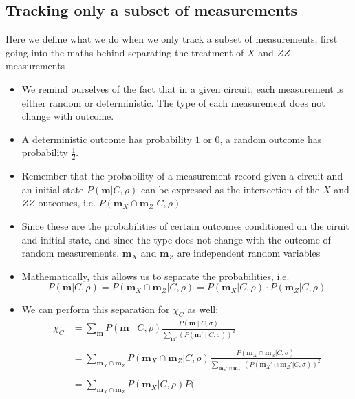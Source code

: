 \subsection{Tracking only a subset of measurements}
\label{sec:lxe-indep}
Here we define what we do when we only track a subset of measurements, first
going into the maths behind separating the treatment of $X$ and $ZZ$
measurements
\begin{itemize}
  \item We remind ourselves of the fact that in a given circuit, each
    measurement is either random or deterministic. The type of each measurement
    does not change with outcome.
  \item A deterministic outcome has probability $1$ or $0$, a random outcome has
    probability $\frac{1}{2}$.
  \item Remember that the probability of a measurement record given a circuit
    and an initial state $P(\mathbf{m} | C, \rho)$ can be expressed as the
    intersection of the $X$ and $ZZ$ outcomes, i.e. $P(\mathbf{m}_X \cap
    \mathbf{m}_Z | C, \rho)$
  \item Since these are the probabilities of certain outcomes conditioned on
    the ciruit and initial state, and since the type does not change with the outcome
    of random measurements, $\mathbf{m}_X$ and $\mathbf{m}_Z$ are independent random
    variables
  \item Mathematically, this allows us to separate the probabilities, i.e. \[
      P(\mathbf{m} | C, \rho) = P(\mathbf{m}_X \cap \mathbf{m}_Z | C, \rho) =
    P(\mathbf{m}_X | C, \rho)\cdot P(\mathbf{m}_Z | C, \rho) \]
  \item We can perform this separation for $\chi_C$ as well:
    \begin{align}
      \label{eq:lxe-subset-fake}
      \chi_C &= \sum_{\mathbf{m}} P(\mathbf{m} \mid C, \rho) \frac{P(\mathbf{m} \mid
      C, \sigma)}{\sum_{\mathbf{m}'}\left(P(\mathbf{m}' \mid
      C, \sigma)\right)^2} \nonumber\\
      \nonumber\\
      &= \sum_{\mathbf{m}_X \cap \mathbf{m}_Z} P(\mathbf{m}_X \cap \mathbf{m}_Z |
        C, \rho) \frac{P(\mathbf{m}_X \cap \mathbf{m}_Z| C,
        \sigma)}{\sum_{\mathbf{m}_X' \cap \mathbf{m}_Z'} \left(P(\mathbf{m}_X' \cap
        \mathbf{m}_Z'|C,\sigma)\right)^2}\nonumber\\
        \nonumber\\
      &= \sum_{\mathbf{m}_X \cap \mathbf{m}_Z} P(\mathbf{m}_X | C, \rho) P(

\end{align}
\end{itemize}

